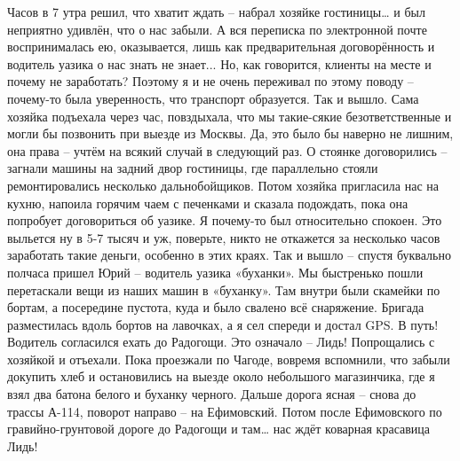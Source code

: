 Часов в 7 утра решил, что хватит ждать – набрал хозяйке гостиницы… и был неприятно удивлён, что о нас забыли. А вся переписка по электронной почте воспринималась ею, оказывается, лишь как предварительная договорённость и водитель уазика о нас знать не знает... Но, как говорится, клиенты на месте и почему не заработать? Поэтому я и не очень переживал по этому поводу – почему-то была уверенность, что транспорт образуется. Так и вышло. Сама хозяйка подъехала через час, повздыхала, что мы такие-сякие безответственные и могли бы позвонить при выезде из Москвы. Да, это было бы наверно не лишним, она права – учтём на всякий случай в следующий раз. 
О стоянке договорились – загнали машины на задний двор гостиницы, где параллельно стояли ремонтировались несколько дальнобойщиков. Потом хозяйка пригласила нас на кухню, напоила горячим чаем с печенками и сказала подождать, пока она попробует договориться об уазике. Я почему-то был относительно спокоен. Это выльется ну в 5-7 тысяч и уж, поверьте, никто не откажется за несколько часов заработать такие деньги, особенно в этих краях. Так и вышло – спустя буквально полчаса пришел Юрий – водитель уазика «буханки». Мы быстренько пошли перетаскали вещи из наших машин в «буханку». Там внутри были скамейки по бортам, а посередине пустота, куда и было свалено всё снаряжение. Бригада разместилась вдоль бортов на лавочках, а я сел спереди и достал GPS. В путь! Водитель согласился ехать до Радогощи. Это означало – Лидь!
Попрощались с хозяйкой и отъехали. Пока проезжали по Чагоде, вовремя вспомнили, что забыли докупить хлеб и остановились на выезде около небольшого магазинчика, где я взял два батона белого и буханку черного. Дальше дорога ясная – снова до трассы А-114, поворот направо – на Ефимовский. Потом после Ефимовского по гравийно-грунтовой дороге до Радогощи и там… нас ждёт коварная красавица Лидь!

\begin{center}
\end{center}
